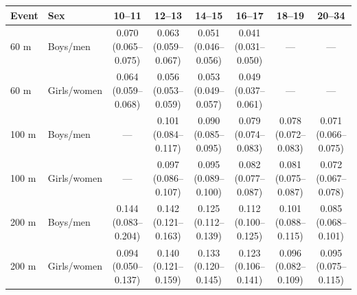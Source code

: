 \begin{tabular}{llcccccc}
\toprule
Event & Sex & 10--11 & 12--13 & 14--15 & 16--17 & 18--19 & 20--34 \\
\midrule
60 m & Boys/men & 0.070 (0.065--0.075) & 0.063 (0.059--0.067) & 0.051 (0.046--0.056) & 0.041 (0.031--0.050) & --- & --- \\
60 m & Girls/women & 0.064 (0.059--0.068) & 0.056 (0.053--0.059) & 0.053 (0.049--0.057) & 0.049 (0.037--0.061) & --- & --- \\
100 m & Boys/men & --- & 0.101 (0.084--0.117) & 0.090 (0.085--0.095) & 0.079 (0.074--0.083) & 0.078 (0.072--0.083) & 0.071 (0.066--0.075) \\
100 m & Girls/women & --- & 0.097 (0.086--0.107) & 0.095 (0.089--0.100) & 0.082 (0.077--0.087) & 0.081 (0.075--0.087) & 0.072 (0.067--0.078) \\
200 m & Boys/men & 0.144 (0.083--0.204) & 0.142 (0.121--0.163) & 0.125 (0.112--0.139) & 0.112 (0.100--0.125) & 0.101 (0.088--0.115) & 0.085 (0.068--0.101) \\
200 m & Girls/women & 0.094 (0.050--0.137) & 0.140 (0.121--0.159) & 0.133 (0.120--0.145) & 0.123 (0.106--0.141) & 0.096 (0.082--0.109) & 0.095 (0.075--0.115) \\
\bottomrule
\end{tabular}
